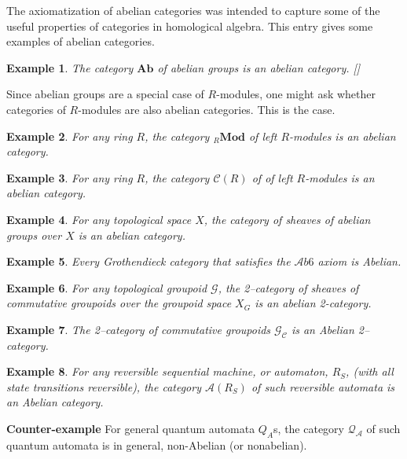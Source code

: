 \documentclass[12pt]{article}
\newcommand{\Ab}{\mathbf{Ab}}
\newcommand{\Mod}[1]{{}_{#1}\mathbf{Mod}}
\theoremstyle{example}
\newtheorem{example}{Example}
\begin{document}

The axiomatization of abelian categories was intended to capture some of the useful properties of categories in homological algebra.  This entry gives some examples of abelian categories.

\begin{example}
The category $\Ab$ of abelian groups is an abelian category. []
\end{example}

Since abelian groups are a special case of $R$-modules, one might ask whether categories of $R$-modules are also abelian categories.  This is the case.

\begin{example}
For any ring $R$, the category $\Mod{R}$ of left $R$-modules is an abelian category.
\end{example}

\begin{example}
For any ring $R$, the category $\mathcal{C}(R)$ of  of left $R$-modules is an abelian category.
\end{example}

\begin{example}
For any topological space $X$, the category of sheaves of abelian groups over $X$ is an abelian category.
\end{example}

\begin{example}
Every Grothendieck category that satisfies the $\mathcal{A}b6$ axiom is Abelian.
\end{example}

\begin{example}
For any topological groupoid $\mathcal{G}$, the 2--category of sheaves of commutative groupoids over the groupoid space $X_G$ is an abelian 2-category.
\end{example}

\begin{example} 
The 2--category of commutative groupoids $\mathcal{G_C}$ is an Abelian 2--category. 
\end{example}

\begin{example}
For any reversible sequential machine, or automaton, $R_S$, (with all state transitions reversible), the category $\mathcal{A}(R_S)$ of such reversible automata is an Abelian category.
\end{example}

\textbf{Counter-example}
For general quantum automata $Q_A$s, the category $\mathcal{Q_A}$ of such quantum automata is in general, non-Abelian
(or nonabelian).

\end{document}
